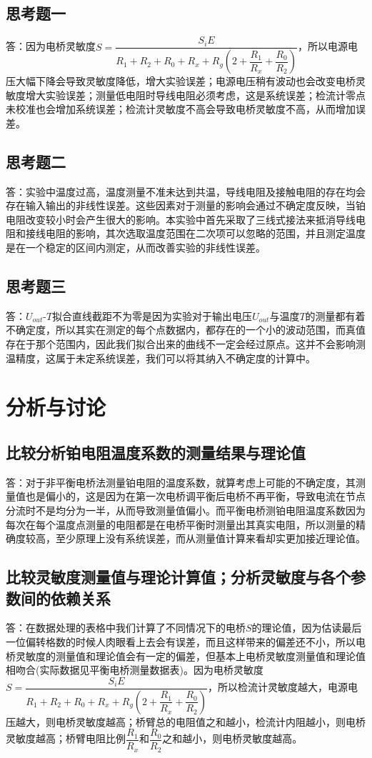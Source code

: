 \documentclass[a4 paper,12pt]{article}
\begin{document}
\subsection{思考题一}
答：因为电桥灵敏度$S=\dfrac{S_{i}E}{R_{1}+R_{2}+R_{0}+R_{x}+R_{g}(2+\dfrac{R_{1}}{R_{x}}+\dfrac{R_{0}}{R_{2}})}$，所以电源电压大幅下降会导致灵敏度降低，增大实验误差；电源电压稍有波动也会改变电桥灵敏度增大实验误差；测量低电阻时导线电阻必须考虑，这是系统误差；检流计零点未校准也会增加系统误差；检流计灵敏度不高会导致电桥灵敏度不高，从而增加误差。
\subsection{思考题二}
答：实验中温度过高，温度测量不准未达到共温，导线电阻及接触电阻的存在均会存在输入输出的非线性误差。这些因素对于测量的影响会通过不确定度反映，当铂电阻改变较小时会产生很大的影响。本实验中首先采取了三线式接法来抵消导线电阻和接线电阻的影响，其次选取温度范围在二次项可以忽略的范围，并且测定温度是在一个稳定的区间内测定，从而改善实验的非线性误差。
\subsection{思考题三}
答：$U_{out}$-$T$拟合直线截距不为零是因为实验对于输出电压$U_{out}$与温度$T$的测量都有着不确定度，所以其实在测定的每个点数据内，都存在的一个小的波动范围，而真值存在于那个范围内，因此我们拟合出来的曲线不一定会经过原点。这并不会影响测温精度，这属于未定系统误差，我们可以将其纳入不确定度的计算中。
\section{分析与讨论}
\subsection{比较分析铂电阻温度系数的测量结果与理论值}
答：对于非平衡电桥法测量铂电阻的温度系数，就算考虑上可能的不确定度，其测量值也是偏小的，这是因为在第一次电桥调平衡后电桥不再平衡，导致电流在节点分流时不是均分为一半，从而导致测量值偏小。而平衡电桥测铂电阻温度系数因为每次在每个温度点测量的电阻都是在电桥平衡时测量出其真实电阻，所以测量的精确度较高，至少原理上没有系统误差，而从测量值计算来看却实更加接近理论值。
\subsection{比较灵敏度测量值与理论计算值；分析灵敏度与各个参数间的依赖关系}
答：在数据处理的表格中我们计算了不同情况下的电桥$S$的理论值，因为估读最后一位偏转格数的时候人肉眼看上去会有误差，而且这样带来的偏差还不小，所以电桥灵敏度的测量值和理论值会有一定的偏差，但基本上电桥灵敏度测量值和理论值相吻合(实际数据见平衡电桥测量数据表)。因为电桥灵敏度$S=\dfrac{S_{i}E}{R_{1}+R_{2}+R_{0}+R_{x}+R_{g}(2+\dfrac{R_{1}}{R_{x}}+\dfrac{R_{0}}{R_{2}})}$，所以检流计灵敏度越大，电源电压越大，则电桥灵敏度越高；桥臂总的电阻值之和越小，检流计内阻越小，则电桥灵敏度越高；桥臂电阻比例$\dfrac{R_{1}}{R_{x}}$和$\dfrac{R_{0}}{R_{2}}$之和越小，则电桥灵敏度越高。
\end{document}
